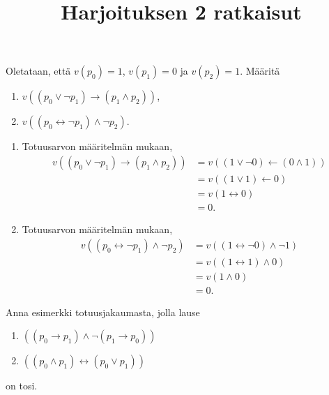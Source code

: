 \documentclass[12pt,a4paper]{article}
\title{Harjoituksen 2 ratkaisut}
\author{}
\date{}
\begin{document}
\maketitle

\noindent

\begin{exercise}
  Oletataan, että \(v(p_0) = 1\), \(v(p_1) = 0\) ja \(v(p_2) = 1\). Määritä
\begin{enumerate}[label=\alph*), nosep]
  \item \(v((p_0 \lor \neg p_1) \rightarrow (p_1 \land p_2))\),
  \item \(v((p_0 \leftrightarrow \neg p_1) \land \neg p_2)\).
\end{enumerate}
\end{exercise}

\begin{solution}
\leavevmode\par
\begin{enumerate}[label=\alph*), nosep]
\item Totuusarvon määritelmän mukaan,
  \[
    \begin{aligned}
      v((p_0 \lor \neg p_1) \rightarrow (p_1 \land p_2)) &= v((1 \lor
      \neg 0) \leftarrow (0 \land 1)) \\
      &= v((1 \lor 1) \leftarrow 0) \\
      &= v(1 \leftrightarrow 0) \\
      &= 0.
    \end{aligned}
  \]

\item Totuusarvon määritelmän mukaan,
  \[
    \begin{aligned}
      v((p_0 \leftrightarrow \neg p_1) \land \neg p_2) &= v((1
      \leftrightarrow \neg 0) \land \neg 1) \\
      &= v((1 \leftrightarrow 1) \land 0) \\
      &= v(1 \land 0) \\
      &= 0.
    \end{aligned}
  \]
\end{enumerate}
\end{solution}

\begin{exercise}
Anna esimerkki totuusjakaumasta, jolla lause
\begin{enumerate}[label=\alph*), nosep]
\item \(((p_0 \rightarrow p_1) \land \neg(p_1 \rightarrow p_0))\)
\item \(((p_0 \land p_1) \leftrightarrow (p_0 \lor p_1))\)
\end{enumerate}
on tosi.
\end{exercise}
\end{document}
